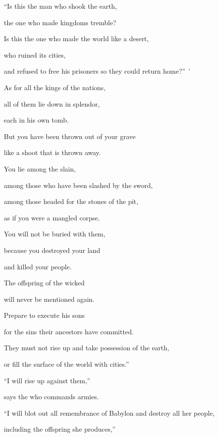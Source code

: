 {\par }{\Q “Is this
the man
who shook
the earth,
\par }{\Q the one who made kingdoms
tremble?
\par }{\Q {}Is this the one who
made
the world
like a desert,
\par }{\Q who ruined
its cities,
\par }{\Q and refused
to free
his prisoners
so they could return home?” ’
\par }{\Q As for all
the kings
of the nations,
\par }{\Q all
of them lie
down in splendor,
\par }{\Q each
in his own tomb.
\par }{\Q {}But you
have been thrown out
of your grave
\par }{\Q like a shoot
that is thrown away.
\par }{\Q You lie among
the slain,
\par }{\Q among those who have been slashed
by the sword,
\par }{\Q among those headed for
the stones
of the pit,
\par }{\Q as if you were a mangled
corpse.
\par }{\Q {}You will not
be buried
with
them,

\par }{\Q because
you destroyed
your land
\par }{\Q and killed
your people.
\par }{\Q The offspring
of the wicked
\par }{\Q will never
be mentioned again.
\par }{\Q {}Prepare
to execute
his sons
\par }{\Q for the sins
their ancestors
have committed.

\par }{\Q They must not
rise up
and take possession
of the earth,
\par }{\Q or fill
the surface
of the world
with cities.”
\par }{\Q {}“I will rise
up against
them,”
\par }{\Q says
the
{}
who commands armies.
\par }{\Q “I will blot out
all remembrance
of Babylon
and destroy all her people,
\par }{\Q including the offspring
she produces,”

}
